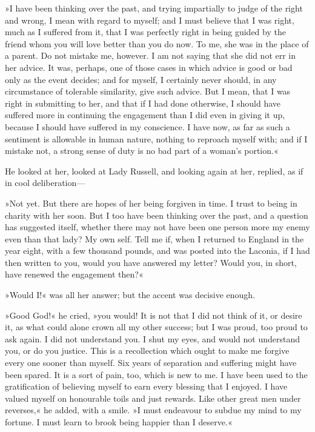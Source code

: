 »I have been thinking over the past, and trying impartially to judge of the right and wrong, I mean with regard to myself; and I must believe that I was right, much as I suffered from it, that I was perfectly right in being guided by the friend whom you will love better than you do now. To me, she was in the place of a parent. Do not mistake me, however. I am not saying that she did not err in her advice. It was, perhaps, one of those cases in which advice is good or bad only as the event decides; and for myself, I certainly never should, in any circumstance of tolerable similarity, give such advice. But I mean, that I was right in submitting to her, and that if I had done otherwise, I should have suffered more in continuing the engagement than I did even in giving it up, because I should have suffered in my conscience. I have now, as far as such a sentiment is allowable in human nature, nothing to reproach myself with; and if I mistake not, a strong sense of duty is no bad part of a woman's portion.«

He looked at her, looked at Lady Russell, and looking again at her, replied, as if in cool deliberation—

»Not yet. But there are hopes of her being forgiven in time. I trust to being in charity with her soon. But I too have been thinking over the past, and a question has suggested itself, whether there may not have been one person more my enemy even than that lady? My own self. Tell me if, when I returned to England in the year eight, with a few thousand pounds, and was posted into the Laconia, if I had then written to you, would you have answered my letter? Would you, in short, have renewed the engagement then?«

»Would I!« was all her answer; but the accent was decisive enough.

»Good God!« he cried, »you would! It is not that I did not think of it, or desire it, as what could alone crown all my other success; but I was proud, too proud to ask again. I did not understand you. I shut my eyes, and would not understand you, or do you justice. This is a recollection which ought to make me forgive every one sooner than myself. Six years of separation and suffering might have been spared. It is a sort of pain, too, which is new to me. I have been used to the gratification of believing myself to earn every blessing that I enjoyed. I have valued myself on honourable toils and just rewards. Like other great men under reverses,« he added, with a smile. »I must endeavour to subdue my mind to my fortune. I must learn to brook being happier than I deserve.«